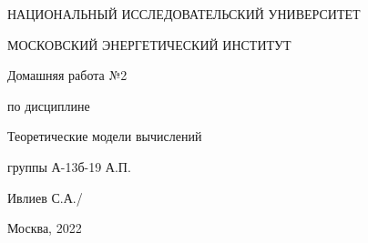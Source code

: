\documentclass{article}
\begin{document}
    \begin{titlepage}

        \thispagestyle{empty}

        \centerline{НАЦИОНАЛЬНЫЙ ИССЛЕДОВАТЕЛЬСКИЙ УНИВЕРСИТЕТ}
        \centerline{МОСКОВСКИЙ ЭНЕРГЕТИЧЕСКИЙ ИНСТИТУТ}

        \vfill

        \centerline{\huge{Домашняя работа №2}}
        \centerline{\large{по дисциплине}}
        \centerline{\LARGE{Теоретические модели вычислений}}

        \vfill

         группы А-13б-19 \hfill {} А.П.

         \hfill \large Ивлиев С.А./

        \vfill

        \centerline{Москва, 2022}
        \clearpage
    \end{titlepage}
    
\end{document}
